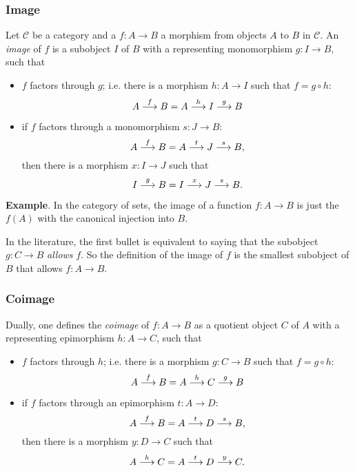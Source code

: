 \documentclass[12pt]{article}
\newcommand{\goto}[1]{\buildrel #1 \over \longrightarrow}
\begin{document}
\subsubsection*{Image}

Let $\mathcal{C}$ be a category and a $f:A\to B$ a morphism from objects $A$ to $B$ in $\mathcal{C}$.  An \emph{image} of $f$ is a subobject $I$ of $B$ with a representing monomorphism $g:I\to B$, such that
\begin{itemize}
\item $f$ factors through $g$; i.e. there is a morphism $h:A\to I$ such that $f=g\circ h$:
$$A \goto{f} B = A \goto{h} I \goto{g} B$$
\item if $f$ factors through a monomorphism $s:J\to B$: 
$$A \goto{f} B = A \goto{t} J \goto{s} B,$$
then there is a morphism $x:I\to J$ such that
$$I \goto{g} B = I \goto{x} J \goto{s} B.$$
\end{itemize}

\textbf{Example}.  In the category of sets, the image of a function $f:A\to B$ is just the  $f(A)$ with the canonical injection into $B$.

In the literature, the first bullet is equivalent to saying that the subobject $g: C\to B$ \emph{allows} $f$.  So the definition of the image of $f$ is the smallest subobject of $B$ that allows $f:A\to B$.

\subsubsection*{Coimage}

Dually, one defines the \emph{coimage} of $f:A\to B$ as a quotient object $C$ of $A$ with a representing epimorphism $h: A\to C$, such that
\begin{itemize}
\item $f$ factors through $h$; i.e. there is a morphism $g:C\to B$ such that $f=g\circ h$:
$$A \goto{f} B = A \goto{h} C \goto{g} B$$
\item if $f$ factors through an epimorphism $t:A\to D$: 
$$A \goto{f} B = A \goto{t} D \goto{s} B,$$
then there is a morphism $y:D\to C$ such that
$$A \goto{h} C = A \goto{t} D \goto{y} C.$$
\end{itemize}
\end{document}
